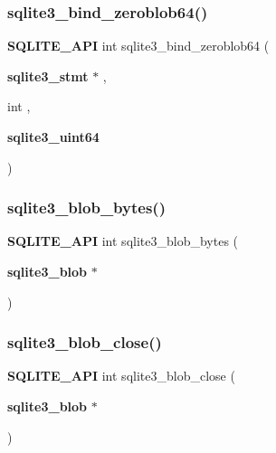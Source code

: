 \mbox{\label{sqlite3_8h_a6a3dc314c41f0c3147beb163659972ba}} 
\subsubsection{sqlite3\_bind\_zeroblob64()}
{\footnotesize\ttfamily \textbf{ S\+Q\+L\+I\+T\+E\+\_\+\+A\+PI} int sqlite3\+\_\+bind\+\_\+zeroblob64 (\begin{DoxyParamCaption}\item[{\textbf{ sqlite3\+\_\+stmt} $\ast$}]{,  }\item[{int}]{,  }\item[{\textbf{ sqlite3\+\_\+uint64}}]{ }\end{DoxyParamCaption})}

\mbox{\label{sqlite3_8h_a05b26a624d06a0e78cee72ec0c27460c}} 
\subsubsection{sqlite3\_blob\_bytes()}
{\footnotesize\ttfamily \textbf{ S\+Q\+L\+I\+T\+E\+\_\+\+A\+PI} int sqlite3\+\_\+blob\+\_\+bytes (\begin{DoxyParamCaption}\item[{\textbf{ sqlite3\+\_\+blob} $\ast$}]{ }\end{DoxyParamCaption})}

\mbox{\label{sqlite3_8h_a8885ae884821e14e1e4501183c5833d6}} 
\subsubsection{sqlite3\_blob\_close()}
{\footnotesize\ttfamily \textbf{ S\+Q\+L\+I\+T\+E\+\_\+\+A\+PI} int sqlite3\+\_\+blob\+\_\+close (\begin{DoxyParamCaption}\item[{\textbf{ sqlite3\+\_\+blob} $\ast$}]{ }\end{DoxyParamCaption})}

\mbox{\label{sqlite3_8h_adb8ad839a5bdd62a43785132bc7dd518}} 

